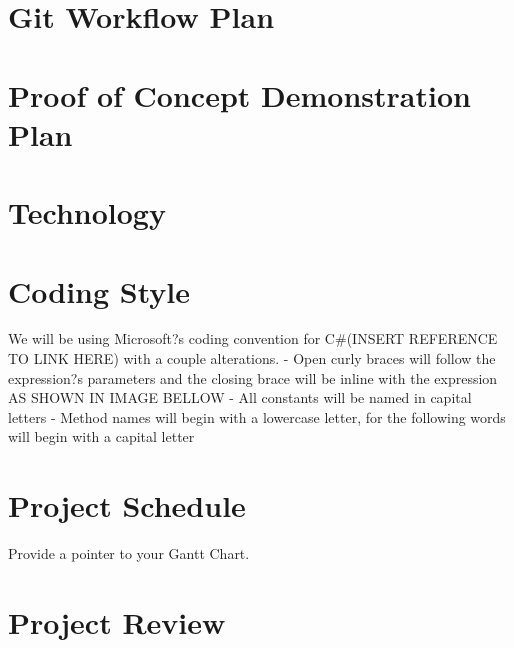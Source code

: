 \documentclass{article}
\begin{document}
\section{Git Workflow Plan}

\section{Proof of Concept Demonstration Plan}

\section{Technology}

\section{Coding Style}
We will be using Microsoft?s coding convention for C\#(INSERT REFERENCE TO LINK HERE) with a couple alterations.
- Open curly braces will follow the expression?s parameters and the closing brace will be inline with the expression AS SHOWN IN IMAGE BELLOW
- All constants will be named in capital letters
- Method names will begin with a lowercase letter, for the following words will begin with a capital letter

\section{Project Schedule}

Provide a pointer to your Gantt Chart.

\section{Project Review}
\end{document}
